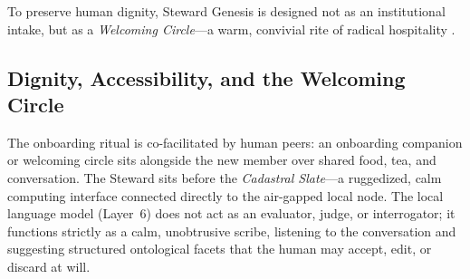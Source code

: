 To preserve human dignity, Steward Genesis is designed not as an institutional intake, but as a \textit{Welcoming Circle}---a warm, convivial rite of radical hospitality \parencite{illich1973}.

\subsection{Dignity, Accessibility, and the Welcoming Circle}

The onboarding ritual is co-facilitated by human peers: an onboarding companion or welcoming circle sits alongside the new member over shared food, tea, and conversation. The Steward sits before the \textit{Cadastral Slate}---a ruggedized, calm computing interface \parencite{weiser1996calm} connected directly to the air-gapped local node. The local language model (Layer~6) does not act as an evaluator, judge, or interrogator; it functions strictly as a calm, unobtrusive scribe, listening to the conversation and suggesting structured ontological facets that the human may accept, edit, or discard at will.

